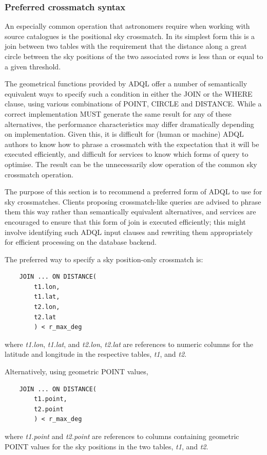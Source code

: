 \documentclass[11pt,a4paper]{ivoa}
\begin{document}
\subsubsection{Preferred crossmatch syntax}
\label{sec:functions.geom.crossmatch}

An especially common operation that astronomers require when working
with source catalogues is the positional sky crossmatch.
In its simplest form this is a join between two tables with the
requirement that the distance along a great circle between the
sky positions of the two associated rows is less than or equal to
a given threshold.

The geometrical functions provided by ADQL offer a number of
semantically equivalent ways to specify such a condition
in either the JOIN or the WHERE clause, using various 
combinations of POINT, CIRCLE and DISTANCE.
While a correct implementation MUST generate the same result for
any of these alternatives, the performance characteristics may
differ dramatically depending on implementation.
Given this, it is difficult for (human or machine) ADQL authors
to know how to phrase a crossmatch with the expectation that it
will be executed efficiently, and difficult for services to know
which forms of query to optimise.  The result can be the 
unnecessarily slow operation of the common sky crossmatch operation.

The purpose of this section is to recommend a preferred form of ADQL
to use for sky crossmatches.  Clients proposing crossmatch-like
queries are advised to phrase them this way rather than semantically
equivalent alternatives, and services are encouraged to ensure that
this form of join is executed efficiently; this might involve 
identifying such ADQL input clauses and rewriting them appropriately 
for efficient processing on the database backend.

The preferred way to specify a sky position-only crossmatch is:
\begin{verbatim}
    JOIN ... ON DISTANCE(
        t1.lon,
        t1.lat,
        t2.lon,
        t2.lat
        ) < r_max_deg
\end{verbatim}
where \textit{t1.lon}, \textit{t1.lat}, and \textit{t2.lon}, \textit{t2.lat}
are references to numeric columns for the latitude and longitude
in the respective tables, \textit{t1}, and \textit{t2}.

Alternatively, using geometric POINT values,
\begin{verbatim}
    JOIN ... ON DISTANCE(
        t1.point,
        t2.point
        ) < r_max_deg
\end{verbatim}
where \textit{t1.point} and \textit{t2.point}
are references to columns containing geometric POINT values
for the sky positions in the two tables, \textit{t1}, and \textit{t2}.
\end{document}

